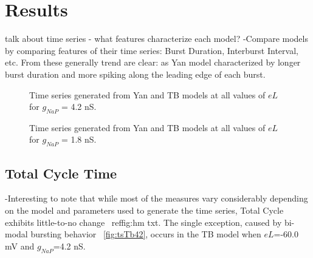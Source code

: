 \documentclass[11pt]{article}
\begin{document}
\oddsidemargin -0.22in
\evensidemargin -0.22in
\topmargin 0.05in
\topskip 0.25in
\headheight 0.05in
\headsep 0.25in

\graphicspath{{"../Data and Analysis/long TB Yan/plots/"}{"../Data and Analysis/short TB Yan/plots/"}}

\section{Results}
talk about time series - what features characterize each model?
-Compare models by comparing features of their time series: Burst Duration, Interburst Interval, etc. 
From these generally trend are clear: as
Yan model characterized by longer burst duration and more spiking along the leading edge of each burst.

\begin{figure}[h]
	\centering
	\caption{Time series generated from Yan and TB models at all values of $eL$ for $g_{NaP}$ = 4.2 nS.}
\end{figure}


\begin{figure}[h]
	\centering
	\caption{Time series generated from Yan and TB models at all values of $eL$ for $g_{NaP}$ = 1.8 nS.}
\end{figure}

\subsection{Total Cycle Time}


-Interesting to note that while most of the measures vary considerably depending on the model and parameters used to generate the time series, Total Cycle exhibits little-to-no change ~ref{fig:hm txt}. The single exception, caused by bi-modal bursting behavior ~\ref{fig:tsTb42}, occurs in the TB model when $eL$=-60.0 mV and $g_{NaP}$=4.2 nS. 
\end{document}
